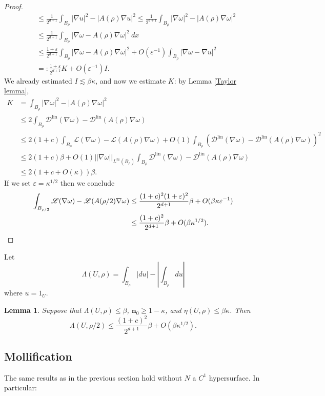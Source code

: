 \documentclass[reqno,12pt,letterpaper]{amsart}
\newcommand{\Lagrange}{\mathscr L}
\newcommand{\DirL}{\mathscr D^{\mathrm{lin}}}
\newcommand{\normal}{\mathbf n}
\newtheorem{lemma}[theorem]{Lemma}
\theoremstyle{definition}
\numberwithin{equation}{section}
\begin{document}
\begin{proof}
\begin{align*}
&\leq \frac{1}{2^{d + 1}} \int_{B_\rho} |\nabla u|^2 - |A(\rho)\nabla u|^2 \leq \frac{1}{2^{d + 1}} \int_{B_\rho} |\nabla \omega|^2 - |A(\rho)\nabla \omega|^2 \\
&\leq \frac{1}{2^{d + 1}} \int_{B_\rho} |\nabla \omega - A(\rho)\nabla \omega|^2 ~dx \\
&\leq \frac{1 + \varepsilon}{2^{d + 1}} \int_{B_\rho} |\nabla \omega - A(\rho)\nabla \omega|^2  + O(\varepsilon^{-1})\int_{B_\rho} |\nabla \omega - \nabla u|^2\\
&=: \frac{1 + \varepsilon}{2^{d + 1}}K + O(\varepsilon^{-1})I.
\end{align*}
We already estimated $I \lesssim \beta \kappa$, and now we estimate $K$: by Lemma \ref{Taylor lemma},
\begin{align*}
K &= \int_{B_\rho} |\nabla \omega|^2 - |A(\rho)\nabla \omega|^2\\
&\leq 2\int_{B_\rho} \DirL(\nabla \omega) - \DirL(A(\rho)\nabla \omega)\\
&\leq 2(1 + c)\int_{B_\rho} \Lagrange(\nabla \omega) - \Lagrange(A(\rho)\nabla\omega) + O(1) \int_{B_\rho} (\DirL(\nabla \omega) - \DirL(A(\rho)\nabla \omega))^2\\
&\leq 2(1 + c)\beta + O(1) ||\nabla \omega||_{L^\infty(B_\rho)} \int_{B_\rho} \DirL(\nabla \omega) - \DirL(A(\rho)\nabla \omega) \\
&\leq 2(1 + c + O(\kappa))\beta.
\end{align*}
If we set $\varepsilon = \kappa^{1/2}$ then we conclude
\begin{align*}
\int_{B_{\rho/2}} \Lagrange(\nabla \omega) - \Lagrange(A(\rho/2)\nabla \omega)
&\leq \frac{(1 + c)^2(1 + \varepsilon)^2}{2^{d + 1}}\beta + O(\beta \kappa \varepsilon^{-1})\\
&\leq \frac{(1 + c)^2}{2^{d + 1}}\beta + O(\beta \kappa^{1/2}). \qedhere
\end{align*}
\end{proof}

Let
$$\Lambda(U, \rho) = \int_{B_\rho} |du| - \left|\int_{B_\rho} du \right|$$
where $u = 1_U$.

\begin{lemma}
Suppose that $\Lambda(U, \rho) \leq \beta$, $\normal_0 \geq 1 - \kappa$, and $\eta(U, \rho) \leq \beta \kappa$.
Then
$$\Lambda(U, \rho/2) \leq \frac{(1 + c)^2}{2^{d + 1}} \beta + O(\beta \kappa^{1/2}).$$
\end{lemma}

\subsection{Mollification}
The same results as in the previous section hold without $N$ a $C^1$ hypersurface.
In particular:
\end{document}
